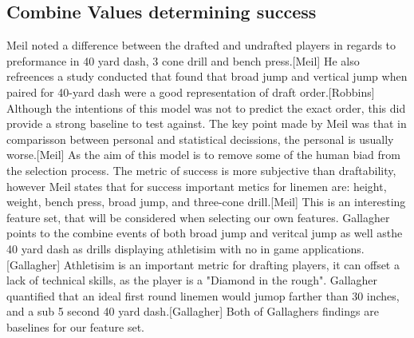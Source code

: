 \documentclass[confrence]{IEEEtran}
\begin{document}
\subsection*{Combine Values determining success}
Meil noted a difference between the drafted and undrafted players in regards to preformance in 40 yard dash, 3 cone drill and bench press.[Meil]
He also refreences a study conducted that found that broad jump and vertical jump when paired for 40-yard dash were a good representation of draft order.[Robbins]
Although the intentions of this model was not to predict the exact order, this did provide a strong baseline to test against.
The key point made by Meil was that in comparisson between personal and statistical decissions, the personal is usually worse.[Meil]
As the aim of this model is to remove some of the human biad from the selection process.
The metric of success is more subjective than draftability, however Meil states that for success important metics for linemen are: height, weight, bench press, broad jump, and three-cone drill.[Meil]
This is an interesting feature set, that will be considered when selecting our own features. 
Gallagher points to the combine events of both broad jump and veritcal jump as well asthe 40 yard dash as drills displaying athletisim with no in game applications.[Gallagher]
Athletisim is an important metric for drafting players, it can offset a lack of technical skills, as the player is a "Diamond in the rough".
Gallagher quantified that an ideal first round linemen would jumop farther than 30 inches, and a sub 5 second 40 yard dash.[Gallagher]
Both of Gallaghers findings are baselines for our feature set. 
\end{document}
